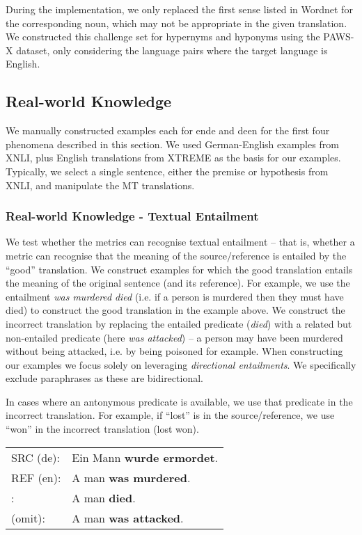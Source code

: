 \documentclass[11pt]{article}
\newcommand{\cmark}{\textcolor{darkpastelgreen}{\ding{51}}}\newcommand{\xmark}{\textcolor{darkpastelred}{\ding{55}}}
\begin{document}
During the implementation, we only replaced the first sense listed in Wordnet for the corresponding noun, which may not be appropriate in the given translation. We constructed this challenge set for hypernyms and hyponyms using the PAWS-X dataset, only considering the language pairs where the target language is English. 



\subsection{Real-world Knowledge}
\label{sec:real-world-knowledge}
We manually constructed examples each for ende and deen for the first four phenomena described in this section. We used German-English examples from XNLI, plus English translations from XTREME as the basis for our examples. Typically, we select a single sentence, either the premise or hypothesis from XNLI, and manipulate the MT translations.

\subsubsection{Real-world Knowledge - Textual Entailment}
\label{sec:real_world_knowledge_entailment}
We test whether the metrics can recognise textual entailment -- that is, whether a metric can recognise that the meaning of the source/reference is entailed  by the ``good'' translation.
We construct examples for which the good translation entails the meaning of the original sentence (and its reference). For example, we use the entailment \textit{was murdered}  \textit{died} (i.e. if a person is murdered then they must have died) to construct the good translation in the example above. We construct the incorrect translation by replacing the entailed predicate (\textit{died}) with a related but non-entailed predicate (here \textit{was attacked}) -- a person may have been murdered without being attacked, i.e. by being poisoned for example. When constructing our examples we focus solely on leveraging \textit{directional entailments}. We specifically exclude paraphrases as these are bidirectional.

In cases where an antonymous predicate is available, we use that predicate in the incorrect translation. For example, if ``lost'' is in the source/reference, we use ``won'' in the incorrect translation (lost  won).


\begin{small}
\vspace{0.5cm}
\setlength{\extrarowheight}{0.1cm}
\begin{tabular}{ll}
     SRC (de): & Ein Mann \textbf{wurde ermordet}.\\
     REF (en): & A man \textbf{was murdered}.\\
     \cmark: & A man \textbf{died}.\\
     \xmark{} (omit): & A man \textbf{was attacked}.
     \vspace{0.35cm}
\end{tabular}
\end{small}
\end{document}

